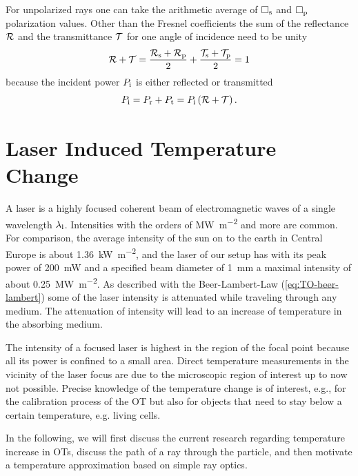 For unpolarized rays one can take the arithmetic average of $\Box_{\mathrm{s}}$ and 
$\Box_{\mathrm{p}}$ polarization values. Other than the Fresnel coefficients the 
sum of the reflectance $\mathcal{R}$ and the transmittance $\mathcal{T}$ for one 
angle of incidence need to be unity
\begin{equation}
  \mathcal{R} + \mathcal{T} = 
  \frac{\mathcal{R}_{\mathrm{s}}+\mathcal{R}_{\mathrm{p}}}{2} +
  \frac{\mathcal{T}_{\mathrm{s}}+\mathcal{T}_{\mathrm{p}}}{2} = 1 
  \label{eq:TO-fresnel}
\end{equation}
because the incident power $P_{\mathrm{i}}$ is either reflected or transmitted
\begin{equation}
  P_{\mathrm{i}} = P_{\mathrm{r}} + P_{\mathrm{t}} = P_{\mathrm{i}}\left( \mathcal{R} + \mathcal{T} 
  \right).
\end{equation}

\section{Laser Induced Temperature Change\label{sec:TO-temperature}}

A laser is a highly focused coherent beam of electromagnetic waves of a single 
wavelength $\lambda_{\mathrm{l}}$. Intensities with the orders of 
\si{\mega\watt\per\square\meter} and more are common. For comparison, the 
average intensity of the sun on to the earth in Central Europe is about 
\SI{1.36}{\kilo\watt\per\square\meter}, and the laser of our setup has with its 
peak power of \SI{200}{\milli\watt} and a specified beam diameter of 
\SI{1}{\mm} a maximal intensity of about 
\SI{0.25}{\mega\watt\per\square\meter}. As described with the Beer-Lambert-Law
(\cref{eq:TO-beer-lambert}) some of the laser intensity is attenuated while 
traveling through any medium. The attenuation of intensity will lead to an 
increase of temperature in the absorbing medium.

The intensity of a focused laser is highest in the region of the focal point 
because all its power is confined to a small area. Direct temperature 
measurements in the vicinity of the laser focus are due to the microscopic 
region of interest up to now not possible. Precise knowledge of the temperature 
change is of interest, e.g., for the calibration process of the OT but also for 
objects that need to stay below a certain temperature, e.g. living cells.

In the following, we will first discuss the current research regarding 
temperature increase in OTs, discuss the path of a ray through the particle, 
and then motivate a temperature approximation based on simple ray optics.

